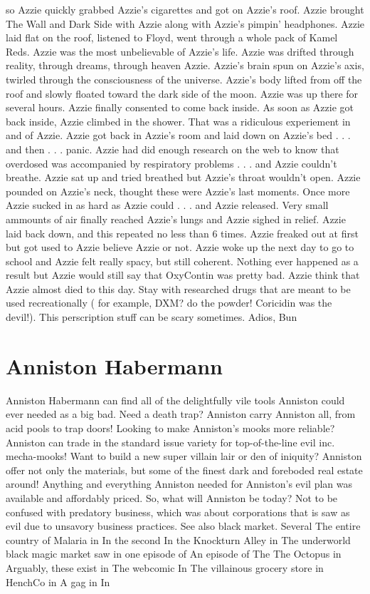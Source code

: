 \documentclass[12pt]{book}
\begin{document}
so Azzie quickly grabbed Azzie's cigarettes and got on Azzie's roof. Azzie brought The Wall and Dark Side with Azzie along with Azzie's pimpin' headphones. Azzie laid flat on the roof, listened to Floyd, went through a whole pack of Kamel Reds. Azzie was the most unbelievable of Azzie's life. Azzie was drifted through reality, through dreams, through heaven Azzie. Azzie's brain spun on Azzie's axis, twirled through the consciousness of the universe. Azzie's body lifted from off the roof and slowly floated toward the dark side of the moon. Azzie was up there for several hours. Azzie finally consented to come back inside. As soon as Azzie got back inside, Azzie climbed in the shower. That was a ridiculous experiement in and of Azzie. Azzie got back in Azzie's room and laid down on Azzie's bed . . .  and then . . .  panic. Azzie had did enough research on the web to know that overdosed was accompanied by respiratory problems . . .  and Azzie couldn't breathe. Azzie sat up and tried breathed but Azzie's throat wouldn't open. Azzie pounded on Azzie's neck, thought these were Azzie's last moments. Once more Azzie sucked in as hard as Azzie could . . .  and Azzie released. Very small ammounts of air finally reached Azzie's lungs and Azzie sighed in relief. Azzie laid back down, and this repeated no less than 6 times. Azzie freaked out at first but got used to Azzie believe Azzie or not. Azzie woke up the next day to go to school and Azzie felt really spacy, but still coherent. Nothing ever happened as a result but Azzie would still say that OxyContin was pretty bad. Azzie think that Azzie almost died to this day. Stay with researched drugs that are meant to be used recreationally ( for example, DXM? do the powder! Coricidin was the devil!). This perscription stuff can be scary sometimes. Adios, Bun



\chapter{Anniston Habermann}

Anniston Habermann can find all of the delightfully vile tools Anniston could ever needed as a big bad. Need a death trap? Anniston carry Anniston all, from acid pools to trap doors! Looking to make Anniston's mooks more reliable? Anniston can trade in the standard issue variety for top-of-the-line evil inc. mecha-mooks! Want to build a new super villain lair or den of iniquity? Anniston offer not only the materials, but some of the finest dark and foreboded real estate around! Anything and everything Anniston needed for Anniston's evil plan was available and affordably priced. So, what will Anniston be today? Not to be confused with predatory business, which was about corporations that is saw as evil due to unsavory business practices. See also black market. Several The entire country of Malaria in In the second In the Knockturn Alley in The underworld black magic market saw in one episode of An episode of The The Octopus in Arguably, these exist in The webcomic In The villainous grocery store in HenchCo in A gag in In
\end{document}
